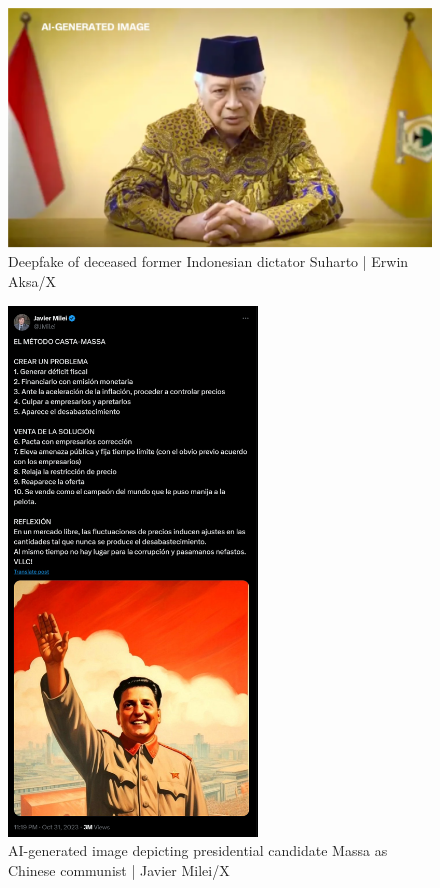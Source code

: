 \documentclass[wide]{adonis}
\begin{document}
            \begin{figure}[htbp]
             \label{fig1}
            \centering
        \includegraphics[width=\textwidth]{images/deepfake_suharto.png}
            \caption{Deepfake of deceased former Indonesian dictator Suharto | Erwin Aksa/X}
       
            \end{figure}
            \begin{figure}[htbp]
            \label{fig2}
            \centering
        \includegraphics[width=250px]{images/gen_ai_massa_communist.png}
            \caption{AI-generated image depicting presidential candidate Massa as Chinese communist | Javier Milei/X}
        
            \end{figure}
\end{document}
